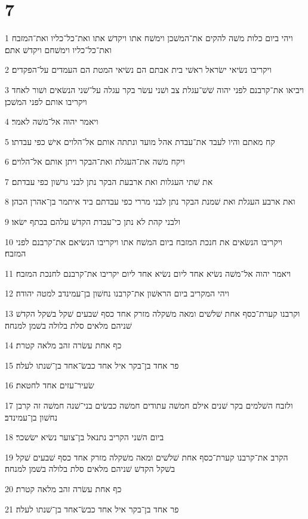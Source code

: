 \chapter{7}

\par 1 ויהי ביום כלות משׁה להקים את־המשׁכן וימשׁח אתו ויקדשׁ אתו ואת־כל־כליו ואת־המזבח ואת־כל־כליו וימשׁחם ויקדשׁ אתם׃
\par 2 ויקריבו נשׂיאי ישׂראל ראשׁי בית אבתם הם נשׂיאי המטת הם העמדים על־הפקדים׃
\par 3 ויביאו את־קרבנם לפני יהוה שׁשׁ־עגלת צב ושׁני עשׂר בקר עגלה על־שׁני הנשׂאים ושׁור לאחד ויקריבו אותם לפני המשׁכן׃
\par 4 ויאמר יהוה אל־משׁה לאמר׃
\par 5 קח מאתם והיו לעבד את־עבדת אהל מועד ונתתה אותם אל־הלוים אישׁ כפי עבדתו׃
\par 6 ויקח משׁה את־העגלת ואת־הבקר ויתן אותם אל־הלוים׃
\par 7 את שׁתי העגלות ואת ארבעת הבקר נתן לבני גרשׁון כפי עבדתם׃
\par 8 ואת ארבע העגלת ואת שׁמנת הבקר נתן לבני מררי כפי עבדתם ביד איתמר בן־אהרן הכהן׃
\par 9 ולבני קהת לא נתן כי־עבדת הקדשׁ עלהם בכתף ישׂאו׃
\par 10 ויקריבו הנשׂאים את חנכת המזבח ביום המשׁח אתו ויקריבו הנשׂיאם את־קרבנם לפני המזבח׃
\par 11 ויאמר יהוה אל־משׁה נשׂיא אחד ליום נשׂיא אחד ליום יקריבו את־קרבנם לחנכת המזבח׃
\par 12 ויהי המקריב ביום הראשׁון את־קרבנו נחשׁון בן־עמינדב למטה יהודה׃
\par 13 וקרבנו קערת־כסף אחת שׁלשׁים ומאה משׁקלה מזרק אחד כסף שׁבעים שׁקל בשׁקל הקדשׁ שׁניהם מלאים סלת בלולה בשׁמן למנחה׃
\par 14 כף אחת עשׂרה זהב מלאה קטרת׃
\par 15 פר אחד בן־בקר איל אחד כבשׂ־אחד בן־שׁנתו לעלה׃
\par 16 שׂעיר־עזים אחד לחטאת׃
\par 17 ולזבח השׁלמים בקר שׁנים אילם חמשׁה עתודים חמשׁה כבשׂים בני־שׁנה חמשׁה זה קרבן נחשׁון בן־עמינדב׃
\par 18 ביום השׁני הקריב נתנאל בן־צוער נשׂיא ישׂשכר׃
\par 19 הקרב את־קרבנו קערת־כסף אחת שׁלשׁים ומאה משׁקלה מזרק אחד כסף שׁבעים שׁקל בשׁקל הקדשׁ שׁניהם מלאים סלת בלולה בשׁמן למנחה׃
\par 20 כף אחת עשׂרה זהב מלאה קטרת׃
\par 21 פר אחד בן־בקר איל אחד כבשׂ־אחד בן־שׁנתו לעלה׃
